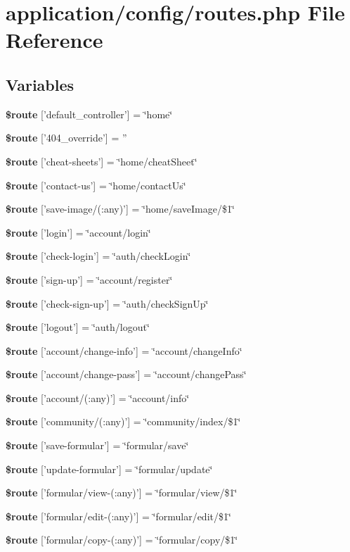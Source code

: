 \section{application/config/routes.php File Reference}
\label{routes_8php}
\subsection*{Variables}
\begin{DoxyCompactItemize}
\item 
{\bf \$route} ['default\-\_\-controller'] = \char`\"{}home\char`\"{}
\item 
{\bf \$route} ['404\-\_\-override'] = ''
\item 
{\bf \$route} ['cheat-\/sheets'] = \char`\"{}home/cheat\-Sheet\char`\"{}
\item 
{\bf \$route} ['contact-\/us'] = \char`\"{}home/contact\-Us\char`\"{}
\item 
{\bf \$route} ['save-\/image/(\-:any)'] = \char`\"{}home/save\-Image/\$1\char`\"{}
\item 
{\bf \$route} ['login'] = \char`\"{}account/login\char`\"{}
\item 
{\bf \$route} ['check-\/login'] = \char`\"{}auth/check\-Login\char`\"{}
\item 
{\bf \$route} ['sign-\/up'] = \char`\"{}account/register\char`\"{}
\item 
{\bf \$route} ['check-\/sign-\/up'] = \char`\"{}auth/check\-Sign\-Up\char`\"{}
\item 
{\bf \$route} ['logout'] = \char`\"{}auth/logout\char`\"{}
\item 
{\bf \$route} ['account/change-\/info'] = \char`\"{}account/change\-Info\char`\"{}
\item 
{\bf \$route} ['account/change-\/pass'] = \char`\"{}account/change\-Pass\char`\"{}
\item 
{\bf \$route} ['account/(\-:any)'] = \char`\"{}account/info\char`\"{}
\item 
{\bf \$route} ['community/(\-:any)'] = \char`\"{}community/index/\$1\char`\"{}
\item 
{\bf \$route} ['save-\/formular'] = \char`\"{}formular/save\char`\"{}
\item 
{\bf \$route} ['update-\/formular'] = \char`\"{}formular/update\char`\"{}
\item 
{\bf \$route} ['formular/view-\/(\-:any)'] = \char`\"{}formular/view/\$1\char`\"{}
\item 
{\bf \$route} ['formular/edit-\/(\-:any)'] = \char`\"{}formular/edit/\$1\char`\"{}
\item 
{\bf \$route} ['formular/copy-\/(\-:any)'] = \char`\"{}formular/copy/\$1\char`\"{}
\end{DoxyCompactItemize}


